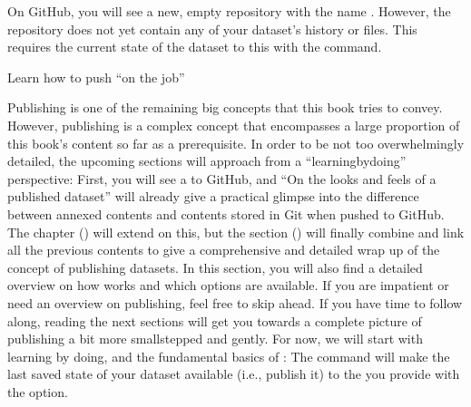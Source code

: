 \ignorespaces 
\sphinxAtStartPar
On GitHub, you will see a new, empty repository with the name
. However, the repository does not yet contain
any of your dataset’s history or files. This requires  the current
state of the dataset to this {\hyperref[\detokenize{glossary:term-sibling}]{}} with the 
command.
\begin{importantnote}[before title={\thetcbcounter\ }, check odd page=true]{Learn how to push “on the job”}

\sphinxAtStartPar
Publishing is one of the remaining big concepts that this book tries to
convey. However, publishing is a complex concept that encompasses a large
proportion of this book’s content so far as a prerequisite. In order to be
not too overwhelmingly detailed, the upcoming sections will approach
 from a “learning\sphinxhyphen{}by\sphinxhyphen{}doing” perspective:
First, you will see a  to GitHub, and “On the looks and feels of a published dataset”
will already give a practical glimpse into the
difference between annexed contents and contents stored in Git when pushed
to GitHub. The chapter {\hyperref[\detokenize{basics/basics-thirdparty:chapter-thirdparty}]{}} () will extend on this,
but the section {\hyperref[\detokenize{basics/101-141-push:push}]{}} ()
will finally combine and link all the previous contents to give a comprehensive
and detailed wrap up of the concept of publishing datasets. In this section,
you will also find a detailed overview on how  works and which
options are available. If you are impatient or need an overview on publishing,
feel free to skip ahead. If you have time to follow along, reading the next
sections will get you towards a complete picture of publishing a bit more
small\sphinxhyphen{}stepped and gently.
For now, we will start with learning by doing, and
the fundamental basics of : The command
will make the last saved state of your dataset available (i.e., publish it)
to the {\hyperref[\detokenize{glossary:term-sibling}]{}} you provide with the  option.


\end{importantnote}

